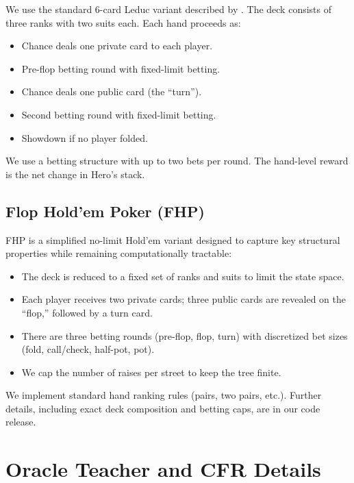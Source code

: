 \documentclass{article}
\begin{document}
We use the standard 6-card Leduc variant described by \citet{neller2013cfrintro}. The deck consists of three ranks with two suits each. Each hand proceeds as:
\begin{itemize}[leftmargin=*]
    \item Chance deals one private card to each player.
    \item Pre-flop betting round with fixed-limit betting.
    \item Chance deals one public card (the ``turn'').
    \item Second betting round with fixed-limit betting.
    \item Showdown if no player folded.
\end{itemize}
We use a betting structure with up to two bets per round. The hand-level reward is the net change in Hero's stack.

\subsection{Flop Hold'em Poker (FHP)}

FHP is a simplified no-limit Hold'em variant designed to capture key structural properties while remaining computationally tractable:
\begin{itemize}[leftmargin=*]
    \item The deck is reduced to a fixed set of ranks and suits to limit the state space.
    \item Each player receives two private cards; three public cards are revealed on the ``flop,'' followed by a turn card.
    \item There are three betting rounds (pre-flop, flop, turn) with discretized bet sizes (fold, call/check, half-pot, pot).
    \item We cap the number of raises per street to keep the tree finite.
\end{itemize}
We implement standard hand ranking rules (pairs, two pairs, etc.). Further details, including exact deck composition and betting caps, are in our code release.

\section{Oracle Teacher and CFR Details}
\label{app:teacher}
\end{document}
